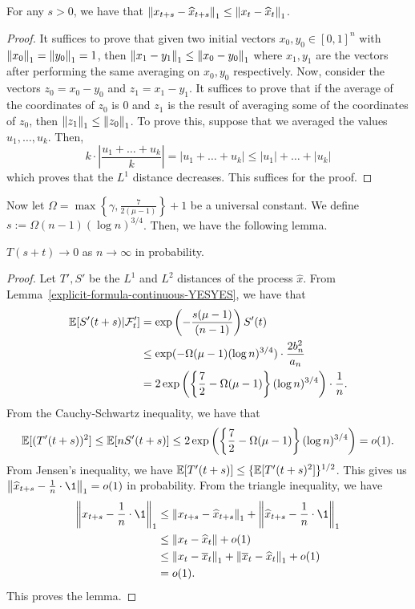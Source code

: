 \documentclass[12pt]{article}
\begin{document}
\begin{lem}
	For any $s > 0$, we have that $\left\lVert x_{t+s} - \widehat{x}_{t+s} \right\rVert_1 \leq \left\lVert x_t - \widehat{x}_t \right\rVert_1$. 
\end{lem}
\begin{proof}
	It suffices to prove that given two initial vectors $x_0, y_0 \in [0, 1]^n$ with $\left\lVert x_0 \right\rVert_1 =\left\lVert y_0 \right\rVert_1 = 1$, then $\left\lVert x_1 - y_1 \right\rVert_1 \leq \left\lVert x_0 - y_0 \right\rVert_1$ where  $x_1, y_1$ are the vectors after performing the same averaging on $x_0, y_0$ respectively. Now, consider the vectors $z_0 = x_0 - y_0$ and $z_1 = x_1 - y_1$. It suffices to prove that if the average of the coordinates of $z_0$ is $0$ and $z_1$ is the result of averaging some of the coordinates of $z_0$, then $\left\lVert z_1 \right\rVert_1 \leq \left\lVert z_0 \right\rVert_1$. To prove this, suppose that we averaged the values $u_1, \ldots, u_k$. Then,
	\[
		k \cdot \left | \frac{u_1 + \ldots + u_k}{k} \right | = |u_1 + \ldots + u_k| \leq |u_1| + \ldots + |u_k|
	\]
	which proves that the $L^1$ distance decreases. This suffices for the proof. 
	\end{proof}

Now let $\Omega = \max \left \{\gamma, \frac{7}{2(\mu -1)} \right \} + 1$ be a universal constant. We define $s := \Omega (n-1) (\log n)^{3/4}$. Then, we have the following lemma. 

\begin{lem}
	$T(s+t) \to 0$ as $n \to \infty$ in probability. 
\end{lem}

\begin{proof}
	Let $T', S'$ be the $L^1$ and $L^2$ distances of the process $\widehat{x}$. From Lemma~\ref{explicit-formula-continuous-YESYES}, we have that
	\begin{align*}
		\mathbb{E} [ S'(t+s) | \mathcal{F}_t' ] & = \exp \left ( - \frac{s (\mu-1)}{(n-1)} \right ) S'(t) \\
		& \leq \exp(- \Omega (\mu-1) (\log n)^{3/4}) \cdot \frac{2b_n^2}{a_n} \\
		& = 2 \exp \left ( \left \{ \frac{7}{2} - \Omega (\mu - 1) \right \} (\log n)^{3/4} \right ) \cdot \frac{1}{n}.
	\end{align*}
	From the Cauchy-Schwartz inequality, we have that
	\[
		\mathbb{E} [(T'(t+s))^2] \leq \mathbb{E} [n S'(t+s)] \leq 2 \exp \left ( \left \{ \frac{7}{2} - \Omega (\mu - 1) \right \} (\log n)^{3/4} \right ) = o(1).
	\]
	From Jensen's inequality, we have $\mathbb{E}[T'(t+s)] \leq \{ \mathbb{E}[T'(t+s)^2] \}^{1/2}$. This gives us $\norm{\widehat{x}_{t+s} - \frac{1}{n} \cdot \1}_1 = o(1)$ in probability. From the triangle inequality, we have
	\begin{align*}
		\norm{x_{t+s} - \frac{1}{n} \cdot \1}_1 & \leq \norm{x_{t+s} - \widehat{x}_{t+s}}_1 + \norm{\widehat{x}_{t+s} - \frac{1}{n} \cdot \1}_1 \\
		& \leq \norm{x_t - \widehat{x}_t} + o(1) \\
		& \leq \norm{x_t - \overline{x}_t}_1 + \norm{\overline{x}_t - \widehat{x}_t}_1 + o(1) \\
		& = o(1).
	\end{align*}
	This proves the lemma. 
\end{proof}
\end{document}
